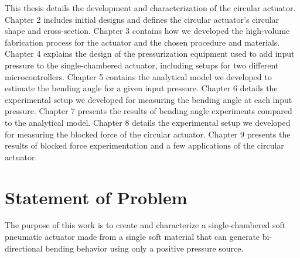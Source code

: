 This thesis details the development and characterization of the circular actuator. Chapter 2 includes initial designs and defines the circular actuator's circular shape and cross-section. Chapter 3 contains how we developed the high-volume fabrication process for the actuator and the chosen procedure and materials. Chapter 4 explains the design of the pressurization equipment used to add input pressure to the single-chambered actuator, including setups for two different microcontrollers. Chapter 5 contains the analytical model we developed to estimate the bending angle for a given input pressure. Chapter 6 details the experimental setup we developed for measuring the bending angle at each input pressure. Chapter 7 presents the results of bending angle experiments compared to the analytical model. Chapter 8 details the experimental setup we developed for measuring the blocked force of the circular actuator. Chapter 9 presents the results of blocked force experimentation and a few applications of the circular actuator. 

\clearpage
\section{Statement of Problem}

The purpose of this work is to create and characterize a single-chambered soft pneumatic actuator made from a single soft material that can generate bi-directional bending behavior using only a positive pressure source. 